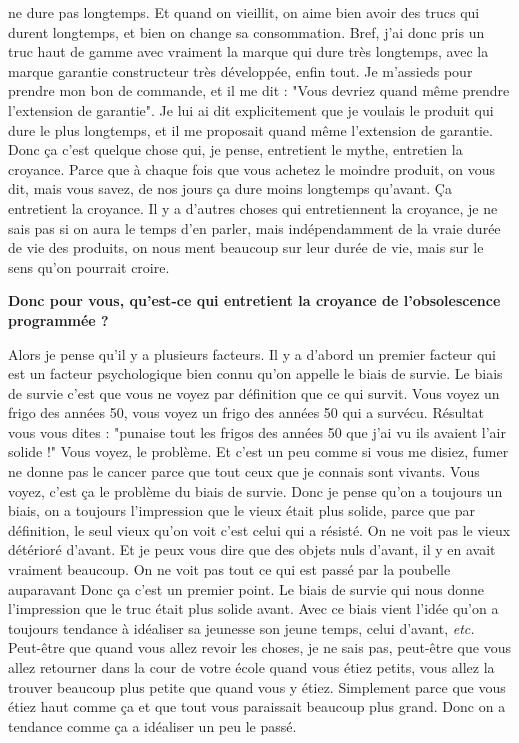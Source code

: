 \begin{small}
ne dure pas longtemps. Et quand on vieillit, on aime bien avoir des trucs qui durent longtemps, et bien on change sa consommation. 
Bref, j'ai donc pris un truc haut de gamme avec vraiment la marque qui dure très longtemps, avec la marque garantie constructeur très développée, enfin tout. Je m'assieds pour prendre mon bon de commande, et il me dit : "Vous devriez quand même prendre l'extension de garantie". Je lui ai dit explicitement que je voulais le produit qui dure le plus longtemps, et il me proposait quand même l'extension de garantie. Donc ça c'est quelque chose qui, je pense, entretient le mythe, entretien la croyance. Parce que à chaque fois que vous achetez le moindre produit, on vous dit, mais vous savez, de nos jours ça dure moins longtemps qu'avant. Ça entretient la croyance. Il y a d'autres choses qui entretiennent la croyance, je ne sais pas si on aura le temps d'en parler, mais indépendamment de la vraie durée de vie des produits, on nous ment beaucoup sur leur durée de vie, mais sur le sens qu'on pourrait croire.

\textbf{Donc pour vous, qu'est-ce qui entretient la croyance de l'obsolescence programmée ?}
\smallbreak


Alors je pense qu'il y a plusieurs facteurs. Il y a d'abord un premier facteur qui est un facteur psychologique bien connu qu'on appelle le biais de survie. Le biais de survie c'est que vous ne voyez par définition que ce qui survit. Vous voyez un frigo des années 50, vous voyez un frigo des années 50 qui a survécu. Résultat vous vous dites : "punaise tout les frigos des années 50 que j'ai vu ils avaient l'air solide !" Vous voyez, le problème. Et c'est un peu comme si vous me disiez, fumer ne donne pas le cancer parce que tout ceux que je connais sont vivants. Vous voyez, c'est ça le problème du biais de survie. Donc je pense qu'on a toujours un biais, on a toujours l'impression que le vieux était plus solide, parce que par définition, le seul vieux qu'on voit c'est celui qui a résisté. On ne voit pas le vieux détérioré d'avant. Et je peux vous dire que des objets nuls d'avant, il y en avait vraiment beaucoup. On ne voit pas tout ce qui est passé par la poubelle auparavant
Donc ça c'est un premier point. Le biais de survie qui nous donne l'impression que le truc était plus solide avant. Avec ce biais vient l'idée qu'on a toujours tendance à idéaliser sa jeunesse son jeune temps, celui d'avant, \textit{etc.} Peut-être que quand vous allez revoir les choses, je ne sais pas, peut-être que vous allez retourner dans la cour de votre école quand vous étiez petits, vous allez la trouver beaucoup plus petite que quand vous y étiez. Simplement parce que vous étiez haut comme ça et que tout vous paraissait beaucoup plus grand. Donc on a tendance comme ça a idéaliser un peu le passé.


\end{small}
